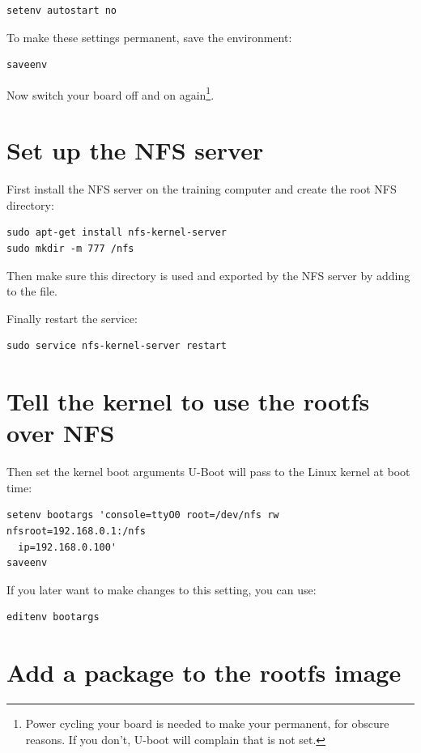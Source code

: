 \begin{verbatim}
setenv autostart no
\end{verbatim}

To make these settings permanent, save the environment:

\begin{verbatim}
saveenv
\end{verbatim}

Now switch your board off and on again\footnote{Power cycling your
board is needed to make your  permanent, for obscure
reasons. If you don't, U-boot will complain that  is not
set.}.

\section{Set up the NFS server}

First install the NFS server on the training computer and create the root NFS
directory:
\begin{verbatim}
sudo apt-get install nfs-kernel-server
sudo mkdir -m 777 /nfs
\end{verbatim}

Then make sure this directory is used and exported by the NFS server by adding
 to the
 file.

Finally restart the service:
\begin{verbatim}
sudo service nfs-kernel-server restart
\end{verbatim}

\section{Tell the kernel to use the rootfs over NFS}

Then set the kernel boot arguments U-Boot will pass to the Linux kernel at boot
time:
\begin{verbatim}
setenv bootargs 'console=ttyO0 root=/dev/nfs rw nfsroot=192.168.0.1:/nfs
  ip=192.168.0.100'
saveenv
\end{verbatim}

If you later want to make changes to this setting, you can use:
\begin{verbatim}
editenv bootargs
\end{verbatim}

\section{Add a package to the rootfs image}

